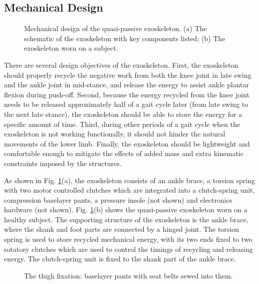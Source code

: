 \documentclass[10pt]{asme2ej}
\begin{document}
\subsection{Mechanical Design}

\begin{figure}[b]
	\caption{Mechanical design of the quasi-passive exoskeleton.
	(a) The schematic of the exoskeleton with key components listed; (b) The exoskeleton worn on a subject.}
	\label{fig:model}   
\end{figure}

There are several design objectives of the exoskeleton.
First, the exoskeleton should properly recycle the negative work from both the knee joint in late swing and the ankle joint in mid-stance, and release the energy to assist ankle plantar flexion during push-off.
Second, because the energy recycled from the knee joint needs to be released approximately half of a gait cycle later (from late swing to the next late stance), the exoskeleton should be able to store the energy for a specific amount of time.
Third, during other periods of a gait cycle when the exoskeleton is not working functionally, it should not hinder the natural movements of the lower limb.
Finally, the exoskeleton should be lightweight and comfortable enough to mitigate the effects of added mass and extra kinematic constraints imposed by the structures.

As shown in Fig. \ref{fig:model}(a), the exoskeleton consists of an ankle brace, a torsion spring with two motor controlled clutches which are integrated into a clutch-spring unit, compression baselayer pants, a pressure insole (not shown) and electronics hardware (not shown).
Fig. \ref{fig:model}(b) shows the quasi-passive exoskeleton worn on a healthy subject.
The supporting structure of the exoskeleton is the ankle brace, where the shank and foot parts are connected by a hinged joint.
The torsion spring is used to store recycled mechanical energy, with its two ends fixed to two rotatory clutches which are used to control the timings of recycling and releasing energy.
The clutch-spring unit is fixed to the shank part of the ankle brace.


\begin{figure}[b]
	\caption{The thigh fixation: baselayer pants with seat belts sewed into them.}
	\label{fig:pants}   
\end{figure}
\end{document}
